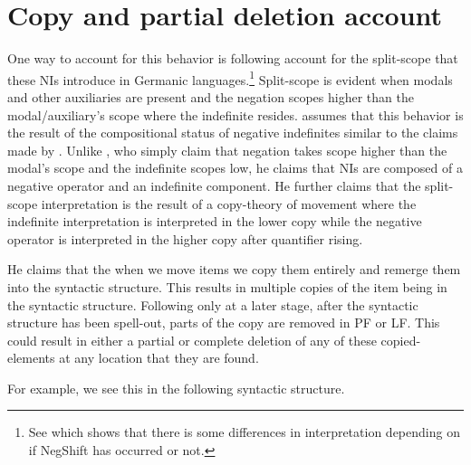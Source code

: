 \documentclass[12pt, letterpaper]{article}
\begin{document}
\section{Copy and partial deletion account} \label{sec:ZEIJLSTRA}

\ea One way to account for this behavior is following \cite{zeijlstraSyntacticallyComplexStatus2011} account for the split-scope that these NIs introduce in Germanic languages.\footnote{See \citet{svenoniusStrainsNegationNorwegian2002} which shows that there is some differences in interpretation depending on if NegShift has occurred or not.} 
\ex Split-scope is evident when modals and other auxiliaries are present and the negation scopes higher than the modal/auxiliary's scope where the indefinite resides. 
\ex \citeauthor{zeijlstraSyntacticallyComplexStatus2011} assumes that this behavior is the result of the compositional status of negative indefinites similar to the claims made by \citet{iatridouNegativeDPsAMovement2011}. 
	\ea Unlike \citeauthor{iatridouNegativeDPsAMovement2011}, who simply claim that negation takes scope higher than the modal's scope and the indefinite scopes low, he claims that NIs are composed of a negative operator and an indefinite component.
	\z 
\ex He further claims that the split-scope interpretation is the result of a copy-theory of movement where the indefinite interpretation is interpreted in the lower copy while the negative operator is interpreted in the higher copy after quantifier rising. 

\ex He claims that the when we move items we copy them entirely and remerge them into the syntactic structure. This results in multiple copies of the item being in the syntactic structure. Following \citet{fanselowRemarksEconomyPronunciation2001,fanselowDistributedDeletion2002} only at a later stage, after the syntactic structure has been spell-out, parts of the copy are removed in PF or LF. This could result in either a partial or complete deletion of any of these copied-elements at any location that they are found. 

\ex For example, we see this in the following syntactic structure. 
	\ea {}
	\z
\end{document}
